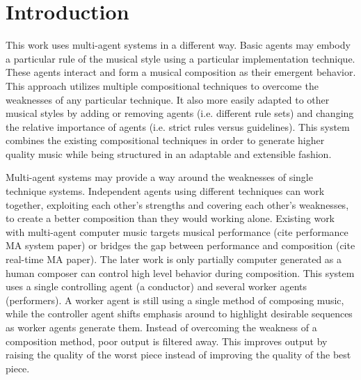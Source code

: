 \section{Introduction}
This work uses multi-agent systems in a different way. Basic agents may embody a particular rule of the musical style using a particular implementation technique.
These agents interact and form a musical composition as their emergent behavior.
This approach utilizes multiple compositional techniques to overcome the weaknesses of any particular technique.
It also more easily adapted to other musical styles by adding or removing agents (i.e. different rule sets) and changing the relative importance of agents (i.e. strict rules versus guidelines).
This system combines the existing compositional techniques in order to generate higher quality music while being structured in an adaptable and extensible fashion.

Multi-agent systems may provide a way around the weaknesses of single technique systems.
Independent agents using different techniques can work together, exploiting each other's strengths and covering each other's weaknesses, to create a better composition than they would working alone.
Existing work with multi-agent computer music targets musical performance (cite performance MA system paper) or bridges the gap between performance and composition (cite real-time MA paper).
The later work is only partially computer generated as a human composer can control high level behavior during composition.
This system uses a single controlling agent (a conductor) and several worker agents (performers).
A worker agent is still using a single method of composing music, while the controller agent shifts emphasis around to highlight desirable sequences as worker agents generate them. 
Instead of overcoming the weakness of a composition method, poor output is filtered away.
This improves output by raising the quality of the worst piece instead of improving the quality of the best piece.
